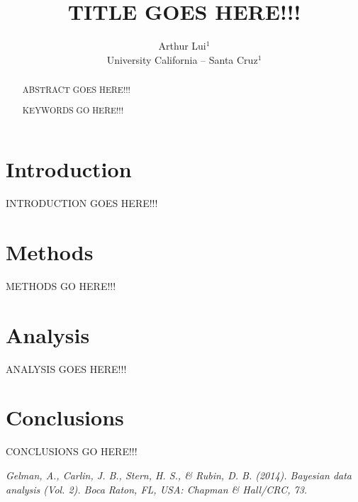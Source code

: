 \documentclass{/path/to/asaproc}
\title{TITLE GOES HERE!!!}
\author{
  Arthur Lui$^1$\\
  University California -- Santa Cruz$^1$\\
}
\begin{document}
\maketitle
\begin{abstract}
ABSTRACT GOES HERE!!!
\begin{keywords}
KEYWORDS GO HERE!!!
\end{keywords}
\end{abstract}

\section{Introduction}
INTRODUCTION GOES HERE!!!

\section{Methods}
METHODS GO HERE!!!

\section{Analysis}
ANALYSIS GOES HERE!!!

\section{Conclusions}
CONCLUSIONS GO HERE!!!

\begin{references}
{\footnotesize
\itemsep=3pt
\item {\em Gelman, A., Carlin, J. B., Stern, H. S., \& Rubin, D. B. (2014). Bayesian data analysis (Vol. 2). Boca Raton, FL, USA: Chapman \& Hall/CRC, 73.}
}

\end{references}
\end{document}
